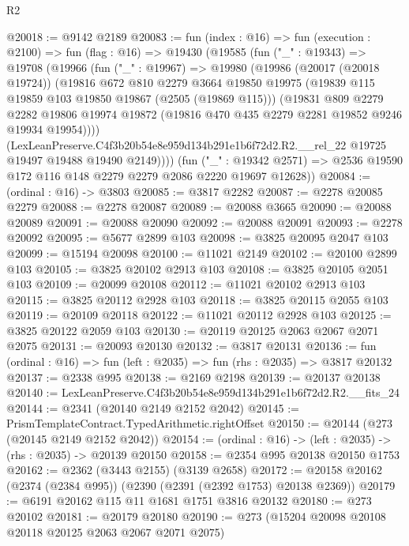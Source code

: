 \begin{lexlean}{R2}
\begin{coremodule}
@20018 := @9142 @2189
@20083 := fun (index : @16) =>
  fun (execution : @2100) =>
  fun (flag : @16) =>
  @19430
    (@19585
      (fun ("_" : @19343) =>
      @19708
        (@19966
          (fun ("_" : @19967) =>
          @19980
            (@19986
              (@20017 (@20018 @19724))
              (@19816
                @672
                @810
                @2279
                @3664
                @19850
                @19975
                (@19839 @115 @19859 @103 @19850 @19867 (@2505 (@19869 @115)))
                (@19831
                  @809
                  @2279
                  @2282
                  @19806
                  @19974
                  @19872
                  (@19816 @470 @435 @2279 @2281 @19852 @9246 @19934 @19954))))
            (LexLeanPreserve.C4f3b20b54e8e959d134b291e1b6f72d2.R2.__rel_22
              @19725
              @19497
              @19488
              @19490
              @2149))))
      (fun ("_" : @19342 @2571) =>
      @2536 @19590 @172 @116 @148 @2279 @2279 @2086 @2220 @19697 @12628))
@20084 := (ordinal : @16) -> @3803
@20085 := @3817 @2282
@20087 := @2278 @20085 @2279
@20088 := @2278 @20087
@20089 := @20088 @3665
@20090 := @20088 @20089
@20091 := @20088 @20090
@20092 := @20088 @20091
@20093 := @2278 @20092
@20095 := @5677 @2899 @103
@20098 := @3825 @20095 @2047 @103
@20099 := @15194 @20098
@20100 := @11021 @2149
@20102 := @20100 @2899 @103
@20105 := @3825 @20102 @2913 @103
@20108 := @3825 @20105 @2051 @103
@20109 := @20099 @20108
@20112 := @11021 @20102 @2913 @103
@20115 := @3825 @20112 @2928 @103
@20118 := @3825 @20115 @2055 @103
@20119 := @20109 @20118
@20122 := @11021 @20112 @2928 @103
@20125 := @3825 @20122 @2059 @103
@20130 := @20119 @20125 @2063 @2067 @2071 @2075
@20131 := @20093 @20130
@20132 := @3817 @20131
@20136 := fun (ordinal : @16) => fun (left : @2035) => fun (rhs : @2035) => @3817 @20132
@20137 := @2338 @995
@20138 := @2169 @2198
@20139 := @20137 @20138
@20140 := LexLeanPreserve.C4f3b20b54e8e959d134b291e1b6f72d2.R2.__fits_24
@20144 := @2341 (@20140 @2149 @2152 @2042)
@20145 := PrismTemplateContract.TypedArithmetic.rightOffset
@20150 := @20144 (@273 (@20145 @2149 @2152 @2042))
@20154 := (ordinal : @16) -> (left : @2035) -> (rhs : @2035) -> @20139 @20150
@20158 := @2354 @995 @20138 @20150 @1753
@20162 := @2362 (@3443 @2155) (@3139 @2658)
@20172 := @20158 @20162 (@2374 (@2384 @995)) (@2390 (@2391 (@2392 @1753) @20138 @2369))
@20179 := @6191 @20162 @115 @11 @1681 @1751 @3816 @20132
@20180 := @273 @20102
@20181 := @20179 @20180
@20190 := @273 (@15204 @20098 @20108 @20118 @20125 @2063 @2067 @2071 @2075)

\end{coremodule}
\end{lexlean}
